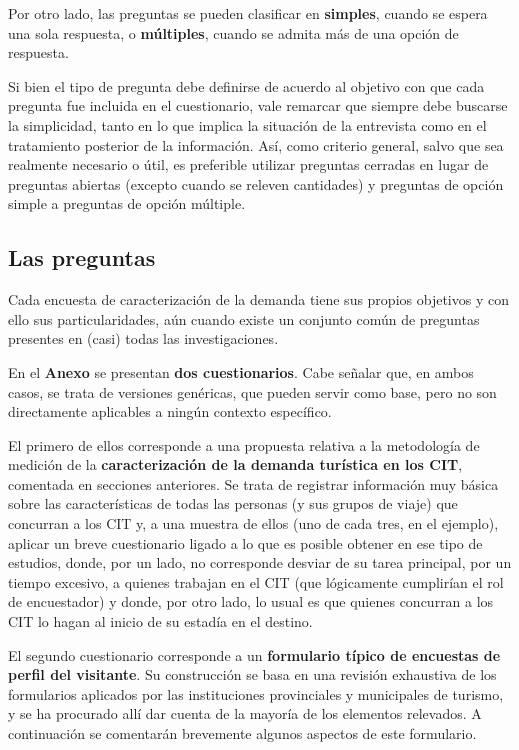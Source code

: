 \documentclass[
]{book}
\begin{document}
Por otro lado, las preguntas se pueden clasificar en \textbf{simples}, cuando se espera una sola respuesta, o \textbf{múltiples}, cuando se admita más de una opción de respuesta.~

Si bien el tipo de pregunta debe definirse de acuerdo al objetivo con que cada pregunta fue incluida en el cuestionario, vale remarcar que siempre debe buscarse la simplicidad, tanto en lo que implica la situación de la entrevista como en el tratamiento posterior de la información. Así, como criterio general, salvo que sea realmente necesario o útil, es preferible utilizar preguntas cerradas en lugar de preguntas abiertas (excepto cuando se releven cantidades) y preguntas de opción simple a preguntas de opción múltiple.

\hypertarget{las-preguntas}{%
\subsection{Las preguntas}\label{las-preguntas}}

Cada encuesta de caracterización de la demanda tiene sus propios objetivos y con ello sus particularidades, aún cuando existe un conjunto común de preguntas presentes en (casi) todas las investigaciones.

En el \textbf{Anexo} se presentan \textbf{dos cuestionarios}. Cabe señalar que, en ambos casos, se trata de versiones genéricas, que pueden servir como base, pero no son directamente aplicables a ningún contexto específico.

El primero de ellos corresponde a una propuesta relativa a la metodología de medición de la \textbf{caracterización de la demanda turística en los CIT}, comentada en secciones anteriores. Se trata de registrar información muy básica sobre las características de todas las personas (y sus grupos de viaje) que concurran a los CIT y, a una muestra de ellos (uno de cada tres, en el ejemplo), aplicar un breve cuestionario ligado a lo que es posible obtener en ese tipo de estudios, donde, por un lado, no corresponde desviar de su tarea principal, por un tiempo excesivo, a quienes trabajan en el CIT (que lógicamente cumplirían el rol de encuestador) y donde, por otro lado, lo usual es que quienes concurran a los CIT lo hagan al inicio de su estadía en el destino.

El segundo cuestionario corresponde a un \textbf{formulario típico de encuestas de perfil del visitante}. Su construcción se basa en una revisión exhaustiva de los formularios aplicados por las instituciones provinciales y municipales de turismo, y se ha procurado allí dar cuenta de la mayoría de los elementos relevados. A continuación se comentarán brevemente algunos aspectos de este formulario.
\end{document}
